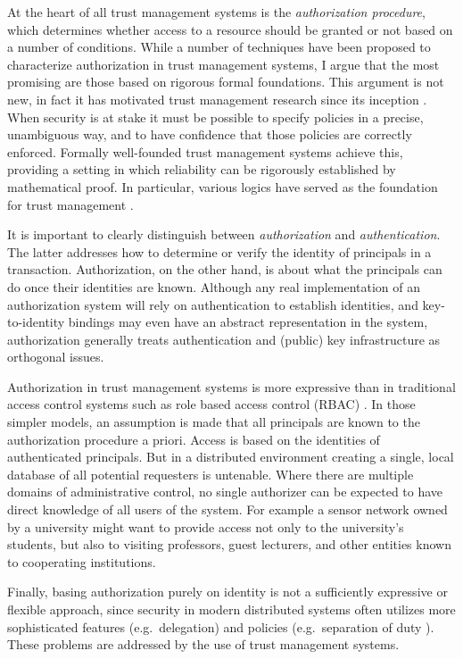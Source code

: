 At the heart of all trust management systems is the \emph{authorization procedure}, which
determines whether access to a resource should be granted or not based on a number of
conditions. While a number of techniques have been proposed to characterize authorization in
trust management systems, I argue that the most promising are those based on rigorous formal
foundations. This argument is not new, in fact it has motivated trust management research since
its inception \cite{woo93authorizations}. When security is at stake it must be possible to
specify policies in a precise, unambiguous way, and to have confidence that those policies are
correctly enforced. Formally well-founded trust management systems achieve this, providing a
setting in which reliability can be rigorously established by mathematical proof. In particular,
various logics have served as the foundation for trust management
\cite{Abadi:LAC,Bertino:LFRAACM}.

It is important to clearly distinguish between \emph{authorization} and \emph{authentication}.
The latter addresses how to determine or verify the identity of principals in a transaction.
Authorization, on the other hand, is about what the principals can do once their identities are
known. Although any real implementation of an authorization system will rely on authentication
to establish identities, and key-to-identity bindings may even have an abstract representation
in the system, authorization generally treats authentication and (public) key infrastructure as
orthogonal issues.

Authorization in trust management systems is more expressive than in traditional access control
systems such as role based access control (RBAC) \cite{Sandhu:RBACM}. In those simpler models,
an assumption is made that all principals are known to the authorization procedure a priori.
Access is based on the identities of authenticated principals. But in a distributed environment
creating a single, local database of all potential requesters is untenable. Where there are
multiple domains of administrative control, no single authorizer can be expected to have direct
knowledge of all users of the system. For example a sensor network owned by a university might
want to provide access not only to the university's students, but also to visiting professors,
guest lecturers, and other entities known to cooperating institutions.

Finally, basing authorization purely on identity is not a sufficiently expressive or flexible
approach, since security in modern distributed systems often utilizes more sophisticated
features (e.g.~delegation) and policies (e.g.~separation of duty \cite{Simon:SODRBE}). These
problems are addressed by the use of trust management systems.

